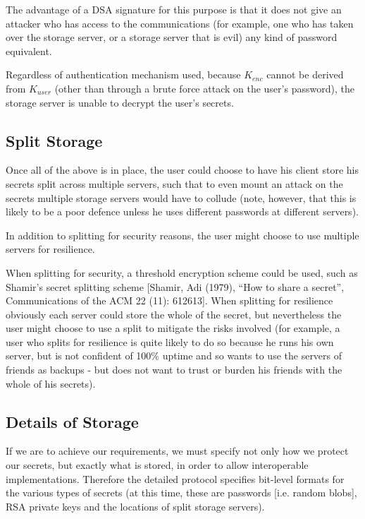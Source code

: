 \documentclass[a4paper,titlepage]{article}
\begin{document}
The advantage of a DSA signature for this purpose is that it does not
give an attacker who has access to the communications (for example,
one who has taken over the storage server, or a storage server that is
evil) any kind of password equivalent.

Regardless of authentication mechanism used, because $K_{enc}$ cannot
be derived from $K_{user}$ (other than through a brute force attack on
the user's password), the storage server is unable to decrypt the
user's secrets.

\subsection{Split Storage}

Once all of the above is in place, the user could choose to have his
client store his secrets split across multiple servers, such that to
even mount an attack on the secrets multiple storage servers would
have to collude (note, however, that this is likely to be a poor
defence unless he uses different passwords at different servers).

In addition to splitting for security reasons, the user might choose
to use multiple servers for resilience.

When splitting for security, a threshold encryption scheme could be
used, such as Shamir's secret splitting scheme [Shamir, Adi (1979),
  ``How to share a secret'', Communications of the ACM 22 (11):
  612613]. When splitting for resilience obviously each server could
store the whole of the secret, but nevertheless the user might choose
to use a split to mitigate the risks involved (for example, a user who
splits for resilience is quite likely to do so because he runs his own
server, but is not confident of 100\% uptime and so wants to use the
servers of friends as backups - but does not want to trust or burden
his friends with the whole of his secrets).

\subsection{Details of Storage}

If we are to achieve our requirements, we must specify not only how we
protect our secrets, but exactly what is stored, in order to allow
interoperable implementations. Therefore the detailed protocol
specifies bit-level formats for the various types of secrets (at this
time, these are passwords [i.e. random blobs], RSA private keys and
the locations of split storage servers).
\end{document}
